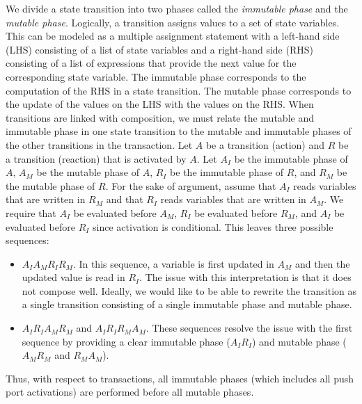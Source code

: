 We divide a state transition into two phases called the \emph{immutable phase} and the \emph{mutable phase}.
Logically, a transition assigns values to a set of state variables.
This can be modeled as a multiple assignment statement with a left-hand side (LHS) consisting of a list of state variables and a right-hand side (RHS) consisting of a list of expressions that provide the next value for the corresponding state variable.
The immutable phase corresponds to the computation of the RHS in a state transition.
The mutable phase corresponds to the update of the values on the LHS with the values on the RHS.
When transitions are linked with composition, we must relate the mutable and immutable phase in one state transition to the mutable and immutable phases of the other transitions in the transaction.
Let $A$ be a transition (action) and $R$ be a transition (reaction) that is activated by $A$.
Let $A_I$ be the immutable phase of $A$, $A_M$ be the mutable phase of $A$, $R_I$ be the immutable phase of $R$, and $R_M$ be the mutable phase of $R$.
For the sake of argument, assume that $A_I$ reads variables that are written in $R_M$ and that $R_I$ reads variables that are written in $A_M$.
We require that $A_I$ be evaluated before $A_M$, $R_I$ be evaluated before $R_M$, and $A_I$ be evaluated before $R_I$ since activation is conditional.
This leaves three possible sequences:
\begin{itemize}
\item $A_I A_M R_I R_M$.  In this sequence, a variable is first updated in $A_M$ and then the updated value is read in $R_I$.  The issue with this interpretation is that it does not compose well.  Ideally, we would like to be able to rewrite the transition as a single transition consisting of a single immutable phase and mutable phase.
\item $A_I R_I A_M R_M$ and $A_I R_I R_M A_M$.  These sequences resolve the issue with the first sequence by providing a clear immutable phase ($A_I R_I$) and mutable phase ($A_M R_M$ and $R_M A_M$).
\end{itemize}
Thus, with respect to transactions, all immutable phases (which includes all push port activations) are performed before all mutable phases.

